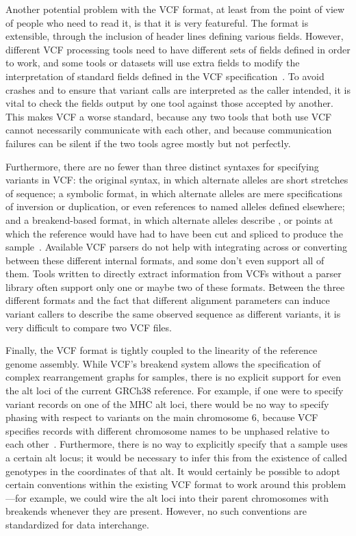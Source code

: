 Another potential problem with the VCF format, at least from the point of view of people who need to read it, is that it is very featureful. The format is extensible, through the inclusion of header lines defining various fields. However, different VCF processing tools need to have different sets of fields defined in order to work, and some tools or datasets \cite{sudmant2015integrated} will use extra fields to modify the interpretation of standard fields defined in the VCF specification~\cite{marshall2013variant}. To avoid crashes and to ensure that variant calls are interpreted as the caller intended, it is vital to check the fields output by one tool against those accepted by another. This makes VCF a worse standard, because any two tools that both use VCF cannot necessarily communicate with each other, and because communication failures can be silent if the two tools agree mostly but not perfectly.

Furthermore, there are no fewer than three distinct syntaxes for specifying variants in VCF: the original syntax, in which alternate alleles are short stretches of sequence; a symbolic format, in which alternate alleles are mere specifications of inversion or duplication, or even references to named alleles defined elsewhere; and a breakend-based format, in which alternate alleles describe , or points at which the reference would have had to have been cut and spliced to produce the sample~\cite{marshall2013variant}. Available VCF parsers do not help with integrating across or converting between these different internal formats, and some don't even support all of them. Tools written to directly extract information from VCFs without a parser library often support only one or maybe two of these formats. Between the three different formats and the fact that different alignment parameters can induce variant callers to describe the same observed sequence as different variants, it is very difficult to compare two VCF files.

Finally, the VCF format is tightly coupled to the linearity of the reference genome assembly. While VCF's breakend system allows the specification of complex rearrangement graphs for samples, there is no explicit support for even the alt loci of the current GRCh38 reference. For example, if one were to specify variant records on one of the MHC alt loci, there would be no way to specify phasing with respect to variants on the main chromosome 6, because VCF specifies records with different chromosome names to be unphased relative to each other~\cite{marshall2013variant}. Furthermore, there is no way to explicitly specify that a sample uses a certain alt locus; it would be necessary to infer this from the existence of called genotypes in the coordinates of that alt. It would certainly be possible to adopt certain conventions within the existing VCF format to work around this problem---for example, we could wire the alt loci into their parent chromosomes with breakends whenever they are present. However, no such conventions are standardized for data interchange.

